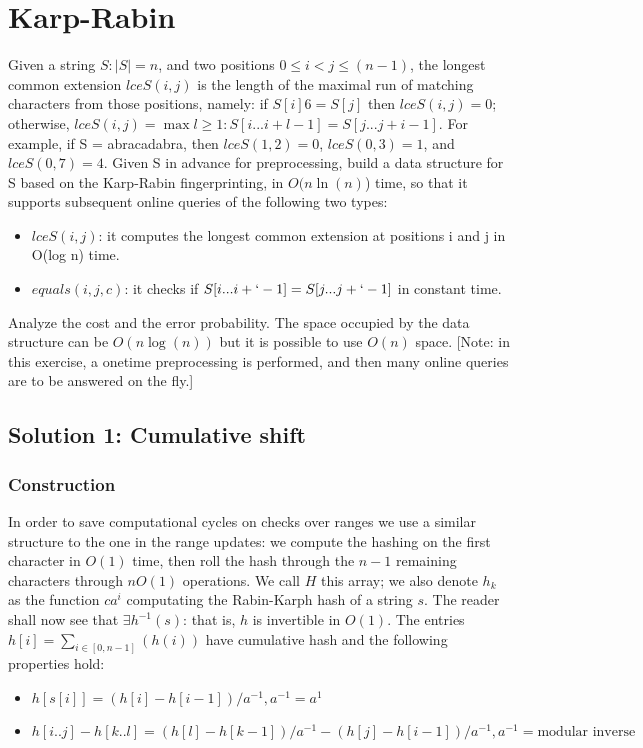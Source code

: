 \documentclass{article}
\begin{document}
\section{Karp-Rabin}
Given a string $S: |S| = n$, and two positions $0 \leq i < j \leq (n - 1)$,
the longest common extension $lceS(i, j)$ is the length of the maximal run of matching
characters from those positions, namely: if $S[i] 6= S[j]$ then $lceS(i, j) = 0$;
otherwise, $lceS(i, j) = \max{l \geq 1 : S[i ... i + l - 1] = S[j ... j + i - 1]}$.
For example, if S = abracadabra, then $lceS(1, 2) = 0$, $lceS(0, 3) = 1$, and
$lceS(0, 7) = 4$.
Given S in advance for preprocessing, build a data structure for S based
on the Karp-Rabin fingerprinting, in $O(n \ln(n)$) time, so that it supports subsequent
online queries of the following two types:
\begin{itemize}
    \item $lceS(i, j)$: it computes the longest common extension at positions i
    and j in O(log n) time.
    \item $equals (i, j, c)$: it checks if $S[i ... i + ` - 1] = S[j ... j + ` - 1]$ in constant time.
\end{itemize}
Analyze the cost and the error probability.
The space occupied by the data structure can be $O(n \log(n))$ but it is possible
to use $O(n)$ space.
[Note: in this exercise, a onetime preprocessing is performed, and then many online
queries are to be answered on the fly.]

\subsection{Solution 1: Cumulative shift}
\subsubsection{Construction}

In order to save computational cycles on checks over ranges we use a similar structure
to the one in the range updates: we compute the hashing on the first character in $O(1)$
time, then roll the hash through the $n - 1$ remaining characters through $n O(1)$
operations.
We call $H$ this array; we also denote $h_k$ as the function $c a^{i}$ computating
the Rabin-Karph hash of a string $s$.
The reader shall now see that $\exists h^{-1}(s)$: that is, $h$ is invertible in $O(1)$.
The entries $h[i] = \sum_{i \in [0, n - 1]}(h(i))$ have cumulative hash and the following
properties hold:
    \begin{itemize}
    \item $h[s[i]] = (h[i] - h[i - 1]) / a^{-1}, a^{-1} = a^{1}$
    \item $h[i..j] - h[k..l] = (h[l] - h[k - 1]) / a^{-1} -
            (h[j] - h[i - 1]) / a^{-1}, a^{-1} = \textrm{modular inverse}$
    \end{itemize}
\end{document}
